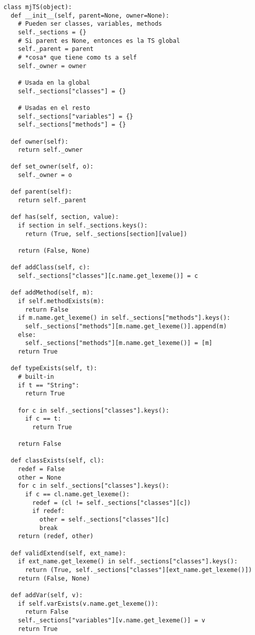 \documentclass [a4paper,abstracton,titlepage]{scrartcl}
\begin{document}
    \begin{lstlisting}
class mjTS(object):
  def __init__(self, parent=None, owner=None):
    # Pueden ser classes, variables, methods
    self._sections = {}
    # Si parent es None, entonces es la TS global
    self._parent = parent
    # *cosa* que tiene como ts a self
    self._owner = owner

    # Usada en la global
    self._sections["classes"] = {}

    # Usadas en el resto
    self._sections["variables"] = {}
    self._sections["methods"] = {}

  def owner(self):
    return self._owner

  def set_owner(self, o):
    self._owner = o

  def parent(self):
    return self._parent

  def has(self, section, value):
    if section in self._sections.keys():
      return (True, self._sections[section][value])

    return (False, None)

  def addClass(self, c):
    self._sections["classes"][c.name.get_lexeme()] = c

  def addMethod(self, m):
    if self.methodExists(m):
      return False
    if m.name.get_lexeme() in self._sections["methods"].keys():
      self._sections["methods"][m.name.get_lexeme()].append(m)
    else:
      self._sections["methods"][m.name.get_lexeme()] = [m]
    return True

  def typeExists(self, t):
    # built-in
    if t == "String":
      return True

    for c in self._sections["classes"].keys():
      if c == t:
        return True

    return False

  def classExists(self, cl):
    redef = False
    other = None
    for c in self._sections["classes"].keys():
      if c == cl.name.get_lexeme():
        redef = (cl != self._sections["classes"][c])
        if redef:
          other = self._sections["classes"][c]
          break
    return (redef, other)

  def validExtend(self, ext_name):
    if ext_name.get_lexeme() in self._sections["classes"].keys():
      return (True, self._sections["classes"][ext_name.get_lexeme()])
    return (False, None)

  def addVar(self, v):
    if self.varExists(v.name.get_lexeme()):
      return False
    self._sections["variables"][v.name.get_lexeme()] = v
    return True


\end{lstlisting}
\end{document}

